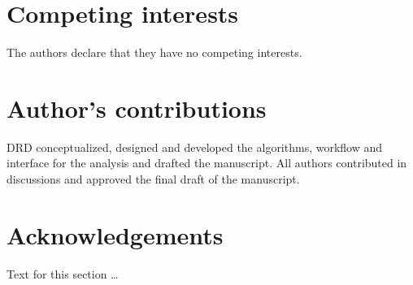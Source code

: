 \documentclass[twocolumn]{bmcart}
\begin{document}

\begin{backmatter}

\section*{Competing interests}

The authors declare that they have no competing interests.



\section*{Author's contributions}

DRD conceptualized, designed and developed the algorithms, workflow and
interface for the analysis and drafted the manuscript.  All authors contributed
in discussions and approved the final draft of the manuscript.



\section*{Acknowledgements}
  Text for this section \ldots




\end{backmatter}
\end{document}
